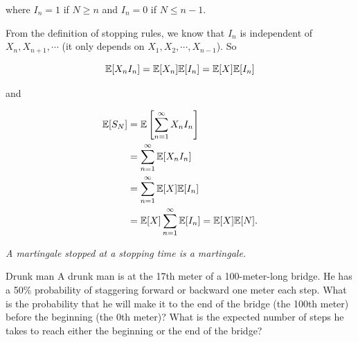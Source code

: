 where $I_n=1$ if $N\geq n$ and $I_n=0$ if $N\leq n-1$.

From the definition of stopping rules, we know that $I_n$ is independent of
$X_n,X_{n+1},\cdots$ (it only depends on $X_1,X_2,\cdots,X_{n-1}$). So

\[
\mathbb{E}[X_nI_n]=\mathbb{E}[X_n]\mathbb{E}[I_n]=\mathbb{E}[X]\mathbb{E}[I_n]
\]

and

\[
\begin{aligned}
\mathbb{E}[S_N]
&=\mathbb{E}\left[\sum_{n=1}^{\infty}X_nI_n\right]\\
&=\sum_{n=1}^{\infty}\mathbb{E}[X_nI_n]\\
&=\sum_{n=1}^{\infty}\mathbb{E}[X]\mathbb{E}[I_n]\\
&=\mathbb{E}[X]\sum_{n=1}^{\infty}\mathbb{E}[I_n]=\mathbb{E}[X]\mathbb{E}[N].
\end{aligned}
\]

\noindent\emph{A martingale stopped at a stopping time is a martingale.}

\begin{problem}{Drunk man}
A drunk man is at the 17th meter of a 100-meter-long bridge. He has a 50\% probability
of staggering forward or backward one meter each step. What is the probability that he
will make it to the end of the bridge (the 100th meter) before the beginning (the 0th
meter)? What is the expected number of steps he takes to reach either the beginning or
the end of the bridge?
\end{problem}

